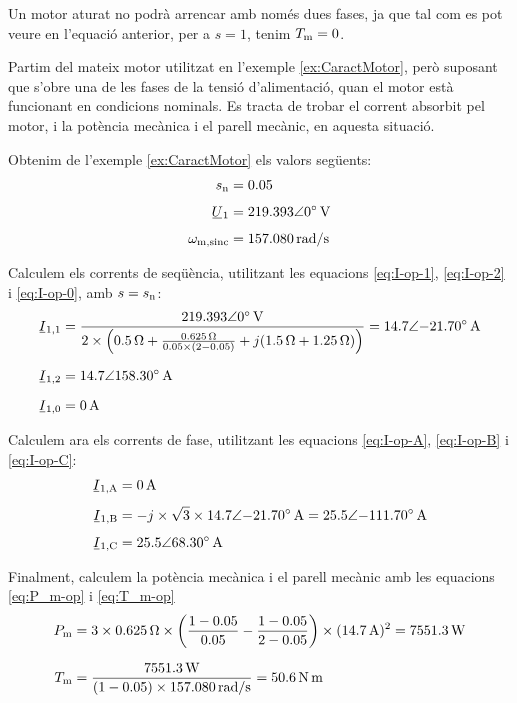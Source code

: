 	    
Un motor aturat no podrà arrencar amb només dues fases, ja que tal com es pot veure en l'equació anterior, per a  $s=1$, tenim $T_\mathrm{m}=0$.	    

	
\begin{exemple}\label{ex:MotorFaseOberta}
\addcontentsxms{\MotorFaseOberta}
	Partim del mateix motor utilitzat en l'exemple \vref{ex:CaractMotor}, però suposant que s'obre una de les fases de la tensió d'alimentació, quan el motor està funcionant en condicions nominals. Es tracta de trobar el corrent absorbit pel motor, i la potència mecànica i el parell mecànic, en aquesta situació.
	
	Obtenim de l'exemple \ref{ex:CaractMotor} els valors següents:
	\begin{align*}
		s\ped{n} &= \num{0,05} \\[1ex]
		\cmplx{U}_1 &=  \complexqty{219,393:0}{V} \\[1ex]
		\omega\ped{m,sinc} &= \qty{157,080}{rad/s}
	\end{align*}

	Calculem els corrents de seqüència, utilitzant les equacions \eqref{eq:I-op-1}, \eqref{eq:I-op-2} i \eqref{eq:I-op-0}, amb $s = s_\mathrm{n}$:
	\begin{align*}
		\cmplx{I}_{1,1} &= \frac{\complexqty{219,393:0}{V}}{2\times \left(\qty{0,5}{\ohm} + \frac{\qty{0,625}{\ohm}}{\num{0,05}\times(2-\num{0,05})} + j (\qty{1,5}{\ohm}+\qty{1,25}{\ohm}) \right)} = \complexqty{14,7:-21,70}{A} \\[1.5ex]
		\cmplx{I}_{1,2}  &=  \complexqty{14,7:158,30}{A} \\[1.5ex]
		\cmplx{I}_{1,0}  &= \qty{0}{A}
	\end{align*}
	
	Calculem ara els corrents de fase, utilitzant les equacions \eqref{eq:I-op-A}, \eqref{eq:I-op-B} i \eqref{eq:I-op-C}:
	\begin{align*}
		\cmplx{I}\ped{1,A} &= \qty{0}{A} \\[1ex]
		\cmplx{I}\ped{1,B}  &=  -j \times\sqrt{3} \times \complexqty{14,7:-21,70}{A} =  \complexqty{25,5:-111,70}{A}  \\[1ex]
		\cmplx{I}\ped{1,C}  &= \complexqty{25,5:68,30}{A}   
	\end{align*}
	
	Finalment, calculem la potència mecànica i el parell mecànic amb les equacions \eqref{eq:P_m-op} i \eqref{eq:T_m-op}
	\begin{align*}
		P_\mathrm{m} &= 3\times \qty{0,625}{\ohm} \times \left(\frac{1-\num{0,05}}{\num{0,05}} - \frac{1-\num{0,05}}{2-\num{0,05}} \right) \times (\qty{14,7}{A})^2  = \qty{7551,3}{W}\\[1.5ex]
		T_\mathrm{m} &= \frac{\qty{7551,3}{W}}{(1-\num{0,05}) \times \qty{157,080}{rad/s}}  = \qty{50,6}{N.m}
	\end{align*}
	

\end{exemple}
